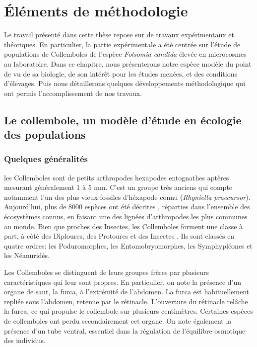 \chapter{Éléments de méthodologie}

Le travail présenté dans cette thèse repose sur de travaux expérimentaux et
théoriques. En particulier, la partie expérimentale a été centrée sur l'étude de
populations de Collemboles de l'espèce \textit{Folsomia candida} élevée en
microcosmes au laboratoire. Dans ce chapitre, nous présenterons notre espèce
modèle du point de vu de sa biologie, de son intérêt pour les études menées, et
des conditions d'élevages. Puis nous détaillerons quelques développements
méthodologique qui ont permis l'accomplissement de nos travaux. 

\section{Le collembole, un modèle d'étude en écologie des populations}

\subsection{Quelques généralités}

les Collemboles sont de petits arthropodes hexapodes entognathes aptères
mesurant généralement 1 à 5 mm. C'est un groupe très anciens qui compte
notamment l'un des plus vieux fossiles d'héxapode connu (\textit{Rhyniella
praecursor}). Aujourd'hui, plus de 8000 espèces ont été décrites
\autocites{bellinger2014a}, réparties dans l'ensemble des écosystèmes connus, en
faisant une des lignées d'arthropodes les plus communes au monde. Bien que
proches des Insectes, les Collemboles forment une classe à part, à côté des
Diploures, des Protoures et des Insectes \autocites{grimaldi2010a}. Ils sont
classés en quatre ordres: les Poduromorphes, les Entomobryomorphes, les
Symphypléones et les Néanuridés.

Les Collemboles se distinguent de leurs groupes frères par plusieurs
caractéristiques qui leur sont propres. En particulier, on note la présence
d'un organe de saut, la furca, à l'extrémité de l'abdomen. La furca est
habituellement repliée sous l'abdomen, retenue par le rétinacle. L'ouverture du
rétinacle relâche la furca, ce qui propulse le collembole sur plusieurs
centimètres. Certaines espèces de collemboles ont perdu secondairement cet
organe. On note également la présence d'un tube ventral, essentiel dans la
régulation de l'équilibre osmotique des individus.

